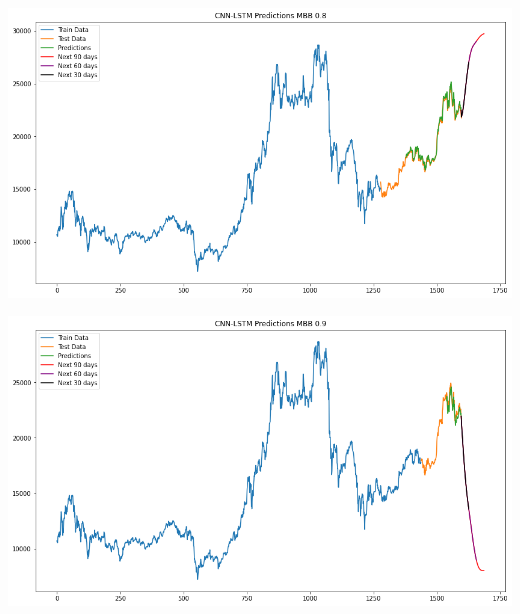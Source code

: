 \documentclass[conference]{IEEEtran}
\begin{document}
\begin{minipage}{0.21\textwidth}
    \centering
    \includegraphics[width=\linewidth]{images/CNN-LSTM/CNNLSTM_MBB_82.png}
    \label{fig:image1}
\end{minipage}
\hfill
\begin{minipage}{0.21\textwidth}
    \centering
    \includegraphics[width=\linewidth]{images/CNN-LSTM/CNNLSTM_MBB_91.png}
    \label{fig:image2}
\end{minipage}
\end{document}

